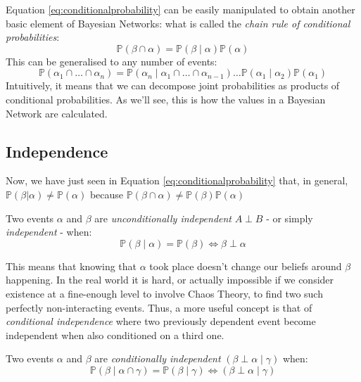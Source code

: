 Equation \ref{eq:conditionalprobability} can be easily manipulated to obtain another basic element of Bayesian Networks: what is called the \textit{chain rule of conditional probabilities}:
\begin{equation} \label{eq:chainrule}
	\mathbb{P}(\beta \cap \alpha) = \mathbb{P}(\beta \mid \alpha) \mathbb{P}(\alpha)
\end{equation}
This can be generalised to any number of events:
\begin{equation} \label{eq:chainrule}
	\mathbb{P}(\alpha_1 \cap \ldots \cap \alpha_n) = \mathbb{P}(\alpha_n \mid \alpha_1 \cap \ldots \cap \alpha_{n-1}) \ldots \mathbb{P}(\alpha_1 \mid \alpha_2 ) \mathbb{P}(\alpha_1) 
\end{equation}
Intuitively, it means that we can decompose joint probabilities as products of conditional probabilities.  
As we'll see, this is how the values in a Bayesian Network are calculated.

\subsection{Independence} \label{subsec:independence}
Now, we have just seen in Equation \ref{eq:conditionalprobability} that, in general, $\mathbb{P}(\beta | \alpha) \neq \mathbb{P}(\alpha)$ because $\mathbb{P}(\beta \cap \alpha) \neq \mathbb{P}(\beta) \mathbb{P}(\alpha)$
\begin{definition}
Two events $\alpha$ and $\beta$ are \textit{unconditionally independent} $A \perp B$ - or simply \textit{independent} - when:
\begin{equation}
	\mathbb{P}(\beta \mid \alpha) = \mathbb{P}(\beta) \Leftrightarrow \beta \perp \alpha
\end{equation}
\end{definition}
This means that knowing that $\alpha$ took place doesn't change our beliefs around $\beta$ happening. 
In the real world it is hard, or actually impossible if we consider existence at a fine-enough level to involve Chaos Theory, to find two such perfectly non-interacting events.
Thus, a more useful concept is that of \textit{conditional independence} where two previously dependent event become independent when also conditioned on a third one.
\begin{definition}
Two events $\alpha$ and $\beta$ are \textit{conditionally independent} $(\beta \perp \alpha \mid \gamma)$ when:
	\begin{equation}
	\mathbb{P}(\beta \mid \alpha \cap \gamma ) = \mathbb{P}(\beta \mid \gamma) \Leftrightarrow (\beta \perp \alpha \mid \gamma)
\end{equation}
\end{definition}


